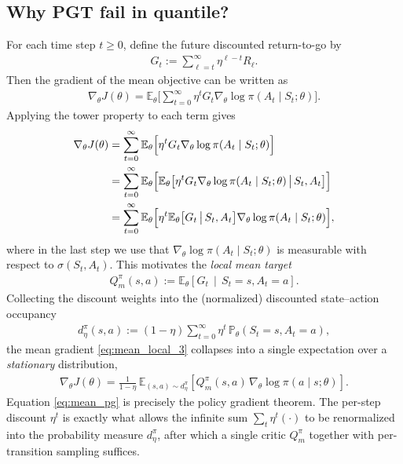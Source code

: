 \subsection{Why PGT fail in quantile?}
For each time step $t\ge 0$, define the future discounted return-to-go by
\begin{align}
    G_t := \sum_{\ell=t}^{\infty}\eta^{\ell-t}R_\ell.
\end{align}
Then the gradient of the mean objective can be written as
\begin{align}
    \nabla_{\theta}J(\theta)
    =
    \mathbb{E}_{\theta}\Biggl[
        \sum_{t=0}^{\infty}
        \eta^t G_t
        \nabla_{\theta}\log\pi(A_t\mid S_t;\theta)
    \Biggr].
\end{align}
Applying the tower property to each term gives
\begin{align}
    \nabla_{\theta}J(\theta)
    &=
    \sum_{t=0}^{\infty}
    \mathbb{E}_{\theta}\Bigl[
        \eta^t G_t
        \nabla_{\theta}\log\pi(A_t\mid S_t;\theta)
    \Bigr] \label{eq:mean_local_1}\\
    &=
    \sum_{t=0}^{\infty}
    \mathbb{E}_{\theta}\Bigl[
        \mathbb{E}_{\theta}\bigl[
            \eta^t G_t
            \nabla_{\theta}\log\pi(A_t\mid S_t;\theta)
            \,\big|\,
            S_t,A_t
        \bigr]
    \Bigr] \label{eq:mean_local_2}\\
    &=
    \sum_{t=0}^{\infty}
    \mathbb{E}_{\theta}\Bigl[
        \eta^t
        \mathbb{E}_{\theta}\bigl[
            G_t
            \,\big|\,
            S_t,A_t
        \bigr]
        \nabla_{\theta}\log\pi(A_t\mid S_t;\theta)
    \Bigr], \label{eq:mean_local_3}
\end{align}
where in the last step we use that $\nabla_{\theta}\log\pi(A_t\mid S_t;\theta)$ is measurable with respect to $\sigma(S_t,A_t)$. This motivates the \emph{local mean target}
\begin{align}
    Q_m^{\pi}(s,a)
    :=
    \mathbb{E}_{\theta}\!\left[
        G_t
        \,\middle|\,
        S_t=s,A_t=a
    \right].
\end{align}
Collecting the discount weights into the (normalized) discounted state--action occupancy
\begin{align}
    d_{\eta}^{\pi}(s,a)
    :=
    (1-\eta)\sum_{t=0}^{\infty}\eta^t\,\mathbb{P}_{\theta}\!\left(S_t=s,A_t=a\right),
\end{align}
the mean gradient \eqref{eq:mean_local_3} collapses into a single expectation over a \emph{stationary} distribution,
\begin{align}\label{eq:mean_pg}
    \nabla_{\theta}J(\theta)
    =
    \frac{1}{1-\eta}\,
    \mathbb{E}_{(s,a)\sim d_{\eta}^{\pi}}\!\left[
        Q_m^{\pi}(s,a)\,
        \nabla_{\theta}\log\pi(a\mid s;\theta)
    \right].
\end{align}
Equation \eqref{eq:mean_pg} is precisely the policy gradient theorem. The per-step discount $\eta^t$ is exactly what allows the infinite sum $\sum_t\eta^t(\cdot)$ to be renormalized into the probability measure $d_{\eta}^{\pi}$, after which a single critic $Q_m^{\pi}$ together with per-transition sampling suffices.

